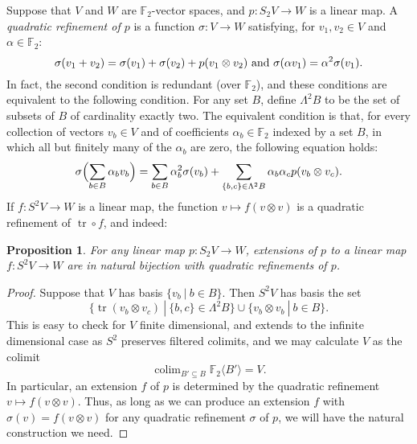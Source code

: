 \documentclass[11pt]{amsart} \renewcommand{\baselinestretch}{1.2}
\theoremstyle{plain}
\newtheorem{prop}[thm]{Proposition}
\numberwithin{equation}{section} %
\theoremstyle{plain}
\newtheorem{prop}[thm]{Proposition}
\numberwithin{equation}{chapter} %
\DeclareMathOperator{\trace}{tr}
\DeclareMathOperator*{\colim}{colim}
\renewcommand{\to}{\longrightarrow}
\newcommand{\F}{\mathbb{F}}
\newcommand{\Ftwo}{\F_2}
\renewcommand{\mapsto}{\longmapsto}
\begin{document}
\begin{Conventions and notation}
Suppose that $V$ and $W$ are $\Ftwo $-vector spaces, and $p:S_2V\to W$ is a linear map. A \emph{quadratic refinement of $p$} is a function $\sigma:V\to W$ satisfying, for $v_1,v_2\in V$ and $\alpha\in\Ftwo $:
\[\sigma(v_1+v_2)=\sigma(v_1)+\sigma(v_2)+p(v_1\otimes v_2)\textup{ and }\sigma(\alpha v_1)=\alpha^2\sigma(v_1).\]
In fact, the second condition is redundant (over $\Ftwo $), and these conditions are equivalent to the following condition. For any set $B$, define $\Lambda^2B$ to be the set of subsets of $B$ of cardinality exactly two. 
The equivalent condition is that, for every collection of vectors $v_b\in V$ and of coefficients $\alpha_b\in \Ftwo $ indexed by a set $B$, in which all but finitely many of the $\alpha_b$ are zero, the following equation holds:
\[\sigma\Bigl(\sum_{b\in B}\alpha_bv_b\Bigr)=\sum_{b\in B}\alpha_b^2\sigma(v_b)+\sum_{\{b,c\}\in \Lambda^2B}\alpha_b\alpha_cp(v_b\otimes v_c).\]
%
%
%
%
%
If $f:S^2V\to W$ is a linear map, the function
$v\mapsto f(v\otimes v)$
is a quadratic refinement of $\trace\circ f$, and indeed:
\begin{prop}
\label{propOnExtendingToInvariants}
For any linear map $p:S_2V\to W$, extensions of $p$ to a linear map $f:S^2V\to W$ are in natural bijection  with quadratic refinements of $p$.
\end{prop}
\begin{proof}
Suppose that $V$ has basis $\{v_b\ |\ b\in B\}$. Then $S^2V$ has basis the set 
\[\{\trace(v_b\otimes v_c)\ |\ \{b,c\}\in\Lambda^2B\}\cup\{v_b\otimes v_b\ |\ b\in B\}.\]
This is easy to check for $V$ finite dimensional, and extends to the infinite dimensional case as $S^2$ preserves filtered colimits, and we may calculate $V$ as the colimit
\[\colim_{B'\subseteq B}\Ftwo \langle B'\rangle=V.\]
In particular, an extension $f$ of $p$ is determined by the quadratic refinement $v\mapsto f(v\otimes v)$. Thus, as long as we can produce an extension $f$ with $\sigma(v)=f(v\otimes v)$ for any quadratic refinement $\sigma$ of $p$, we will have the natural construction we need.


\end{proof}
\end{Conventions and notation}
\end{document}
